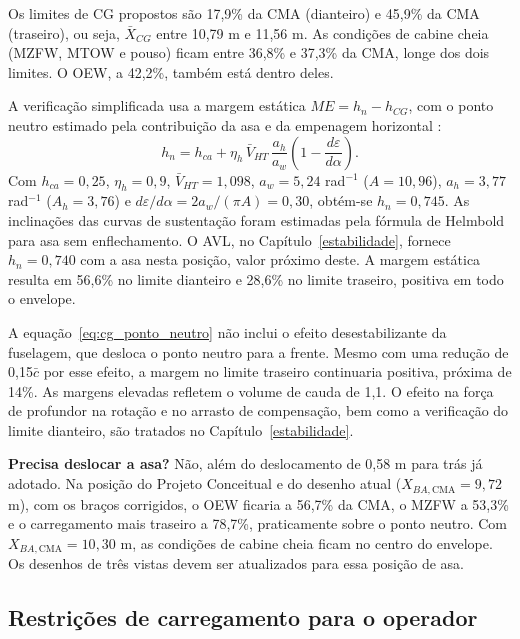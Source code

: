 Os limites de CG propostos são 17,9\% da CMA (dianteiro) e 45,9\% da CMA (traseiro), ou seja, $\bar{X}_{CG}$ entre 10,79 m e 11,56 m. As condições de cabine cheia (MZFW, MTOW e pouso) ficam entre 36,8\% e 37,3\% da CMA, longe dos dois limites. O OEW, a 42,2\%, também está dentro deles.

A verificação simplificada usa a margem estática $ME = h_n - h_{CG}$, com o ponto neutro estimado pela contribuição da asa e da empenagem horizontal \cite{raymer2018}:
\begin{equation}
h_n = h_{ca} + \eta_h \, \bar{V}_{HT} \, \frac{a_h}{a_w}\left(1 - \frac{d\varepsilon}{d\alpha}\right).
\label{eq:cg_ponto_neutro}
\end{equation}
Com $h_{ca} = 0{,}25$, $\eta_h = 0{,}9$, $\bar{V}_{HT} = 1{,}098$, $a_w = 5{,}24$ rad$^{-1}$ ($A = 10{,}96$), $a_h = 3{,}77$ rad$^{-1}$ ($A_h = 3{,}76$) e $d\varepsilon/d\alpha = 2a_w/(\pi A) = 0{,}30$, obtém-se $h_n = 0{,}745$. As inclinações das curvas de sustentação foram estimadas pela fórmula de Helmbold para asa sem enflechamento. O AVL, no Capítulo~\ref{estabilidade}, fornece $h_n = 0{,}740$ com a asa nesta posição, valor próximo deste. A margem estática resulta em 56,6\% no limite dianteiro e 28,6\% no limite traseiro, positiva em todo o envelope.

A equação~\eqref{eq:cg_ponto_neutro} não inclui o efeito desestabilizante da fuselagem, que desloca o ponto neutro para a frente. Mesmo com uma redução de 0,15$\bar{c}$ por esse efeito, a margem no limite traseiro continuaria positiva, próxima de 14\%. As margens elevadas refletem o volume de cauda de 1,1. O efeito na força de profundor na rotação e no arrasto de compensação, bem como a verificação do limite dianteiro, são tratados no Capítulo~\ref{estabilidade}.

\textbf{Precisa deslocar a asa?} Não, além do deslocamento de 0,58 m para trás já adotado. Na posição do Projeto Conceitual e do desenho atual ($X_{BA,\text{CMA}} = 9{,}72$ m), com os braços corrigidos, o OEW ficaria a 56,7\% da CMA, o MZFW a 53,3\% e o carregamento mais traseiro a 78,7\%, praticamente sobre o ponto neutro. Com $X_{BA,\text{CMA}} = 10{,}30$ m, as condições de cabine cheia ficam no centro do envelope. Os desenhos de três vistas devem ser atualizados para essa posição de asa.

\subsection{Restrições de carregamento para o operador}
\label{sec:cg_operador}

